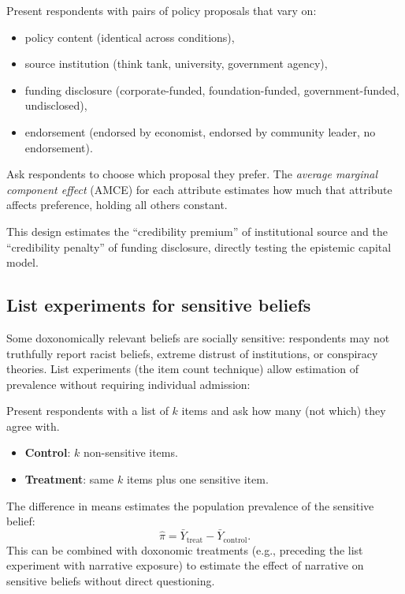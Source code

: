 \begin{model}
\label{mod:conjoint}
Present respondents with pairs of policy proposals that vary on:
\begin{itemize}[nosep]
  \item policy content (identical across conditions),
  \item source institution (think tank, university, government agency),
  \item funding disclosure (corporate-funded, foundation-funded, government-funded, undisclosed),
  \item endorsement (endorsed by economist, endorsed by community leader, no endorsement).
\end{itemize}
Ask respondents to choose which proposal they prefer.
The \emph{average marginal component effect} (AMCE) for each attribute estimates how much that attribute affects preference, holding all others constant.
\end{model}

This design estimates the ``credibility premium'' of institutional source and the ``credibility penalty'' of funding disclosure, directly testing the epistemic capital model.

\subsection{List experiments for sensitive beliefs}

Some doxonomically relevant beliefs are socially sensitive: respondents may not truthfully report racist beliefs, extreme distrust of institutions, or conspiracy theories.
List experiments (the item count technique) allow estimation of prevalence without requiring individual admission:

\begin{model}
\label{mod:list-experiment}
Present respondents with a list of $k$ items and ask how many (not which) they agree with.
\begin{itemize}[nosep]
  \item \textbf{Control}: $k$ non-sensitive items.
  \item \textbf{Treatment}: same $k$ items plus one sensitive item.
\end{itemize}
The difference in means estimates the population prevalence of the sensitive belief:
\[
  \hat{\pi} = \bar{Y}_{\text{treat}} - \bar{Y}_{\text{control}}.
\]
This can be combined with doxonomic treatments (e.g., preceding the list experiment with narrative exposure) to estimate the effect of narrative on sensitive beliefs without direct questioning.
\end{model}

